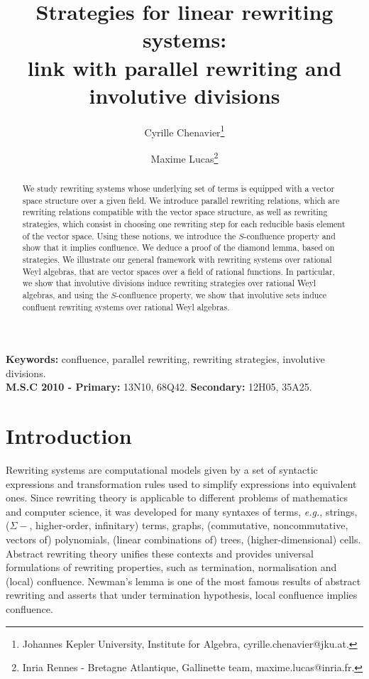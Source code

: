 \documentclass[11pt]{article}
\theoremstyle{definition}
\newcommand\eg{\emph{e.g.}}
\begin{document}
\title{Strategies for linear rewriting systems:\\[0.2cm]
 link with parallel rewriting and involutive divisions\vspace{0.5cm}}
\author{Cyrille Chenavier\footnote{
    Johannes Kepler University, Institute for Algebra,
    cyrille.chenavier@jku.at.
  }\and Maxime Lucas\footnote{Inria Rennes - Bretagne Atlantique,
    Gallinette team, maxime.lucas@inria.fr.}
  }
\date{}

\maketitle
      
\begin{abstract}
  We study rewriting systems whose underlying set of terms is equipped with a
  vector space structure over a given field. We introduce parallel rewriting
  relations, which are rewriting relations compatible with the vector space
  structure, as well as rewriting strategies, which consist in choosing one
  rewriting step for each reducible basis element of the vector space. Using
  these notions, we introduce the $S$-confluence property and show that it
  implies confluence. We deduce a proof of the diamond lemma, based on
  strategies. We illustrate our general framework with rewriting systems over
  rational Weyl algebras, that are vector spaces over a field of rational
  functions. In particular, we show that involutive divisions induce rewriting
  strategies over rational Weyl algebras, and using the $S$-confluence property,
  we show that involutive sets induce confluent rewriting systems over rational
  Weyl algebras.
\end{abstract}
\noindent
\begin{small}\textbf{Keywords:} confluence, parallel rewriting, rewriting
  strategies, involutive divisions.\\[0.2cm]
  \textbf{M.S.C 2010 - Primary:} 13N10, 68Q42. \textbf{Secondary:} 12H05,
  35A25.
\end{small}

\tableofcontents

\section{Introduction}

Rewriting systems are computational models given by a set of syntactic
expressions and transformation rules used to simplify expressions into
equivalent ones. Since rewriting theory is applicable to different
problems of mathematics and computer science, it was developed for many
syntaxes of terms, \eg, strings, ($\Sigma-$, higher-order, infinitary)
terms, graphs, (commutative, noncommutative, vectors of) polynomials,
(linear combinations of) trees, (higher-dimensional) cells. Abstract
rewriting theory unifies these contexts and provides universal
formulations of rewriting properties, such as termination, normalisation
and (local) confluence. Newman's lemma is one of the most famous results 
of abstract rewriting and asserts that under termination hypothesis, 
local confluence implies confluence.
\medskip
\end{document}
